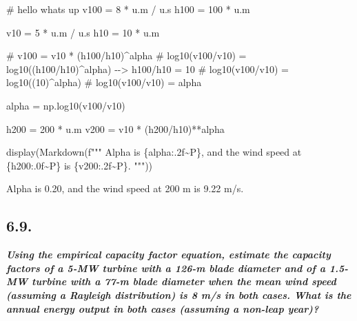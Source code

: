 \documentclass[
  letterpaper,
  DIV=11,
  numbers=noendperiod]{scrartcl}
\newenvironment{Shaded}{\begin{snugshade}}{\end{snugshade}}
\newcommand{\CommentTok}[1]{\textcolor[rgb]{0.37,0.37,0.37}{#1}}
\newcommand{\DecValTok}[1]{\textcolor[rgb]{0.68,0.00,0.00}{#1}}
\newcommand{\ErrorTok}[1]{\textcolor[rgb]{0.68,0.00,0.00}{#1}}
\newcommand{\FloatTok}[1]{\textcolor[rgb]{0.68,0.00,0.00}{#1}}
\newcommand{\NormalTok}[1]{\textcolor[rgb]{0.00,0.23,0.31}{#1}}
\newcommand{\OperatorTok}[1]{\textcolor[rgb]{0.37,0.37,0.37}{#1}}
\newcommand{\SpecialCharTok}[1]{\textcolor[rgb]{0.37,0.37,0.37}{#1}}
\newcommand{\SpecialStringTok}[1]{\textcolor[rgb]{0.13,0.47,0.30}{#1}}
\begin{document}
\begin{Shaded}
\begin{Highlighting}[]
\CommentTok{\# hello whats up }
\NormalTok{v100 }\OperatorTok{=} \DecValTok{8} \OperatorTok{*}\NormalTok{ u.m }\OperatorTok{/}\NormalTok{ u.s }
\NormalTok{h100 }\OperatorTok{=} \DecValTok{100} \OperatorTok{*}\NormalTok{ u.m }

\NormalTok{v10 }\OperatorTok{=} \DecValTok{5} \OperatorTok{*}\NormalTok{ u.m }\OperatorTok{/}\NormalTok{ u.s }
\NormalTok{h10 }\OperatorTok{=} \DecValTok{10} \OperatorTok{*}\NormalTok{ u.m }

\CommentTok{\# v100 = v10 * (h100/h10)\^{}alpha }
\CommentTok{\# log10(v100/v10) = log10((h100/h10)\^{}alpha) {-}{-}\textgreater{}  h100/h10 = 10 }
\CommentTok{\# log10(v100/v10) = log10((10)\^{}alpha)}
\CommentTok{\# log10(v100/v10) = alpha}

\NormalTok{alpha }\OperatorTok{=}\NormalTok{ np.log10(v100}\OperatorTok{/}\NormalTok{v10)}

\NormalTok{h200 }\OperatorTok{=} \DecValTok{200} \OperatorTok{*}\NormalTok{ u.m}
\NormalTok{v200 }\OperatorTok{=}\NormalTok{ v10 }\OperatorTok{*}\NormalTok{ (h200}\OperatorTok{/}\NormalTok{h10)}\OperatorTok{**}\NormalTok{alpha}

\NormalTok{display(Markdown(}\SpecialStringTok{f"""}
\SpecialStringTok{Alpha is  }\SpecialCharTok{\{}\NormalTok{alpha}\SpecialCharTok{:}\FloatTok{.2}\ErrorTok{f}\OperatorTok{\textasciitilde{}}\NormalTok{P}\SpecialCharTok{\}}\SpecialStringTok{, and the wind speed at }\SpecialCharTok{\{}\NormalTok{h200}\SpecialCharTok{:}\FloatTok{.0}\ErrorTok{f}\OperatorTok{\textasciitilde{}}\NormalTok{P}\SpecialCharTok{\}}\SpecialStringTok{ is }\SpecialCharTok{\{}\NormalTok{v200}\SpecialCharTok{:}\FloatTok{.2}\ErrorTok{f}\OperatorTok{\textasciitilde{}}\NormalTok{P}\SpecialCharTok{\}}\SpecialStringTok{.}
\SpecialStringTok{"""}\NormalTok{))}
\end{Highlighting}
\end{Shaded}

Alpha is 0.20, and the wind speed at 200 m is 9.22 m/s.

\hypertarget{section-3}{%
\subsection{6.9.}\label{section-3}}

\textbf{\emph{Using the empirical capacity factor equation, estimate the
capacity factors of a 5-MW turbine with a 126-m blade diameter and of a
1.5-MW turbine with a 77-m blade diameter when the mean wind speed
(assuming a Rayleigh distribution) is 8 m/s in both cases. What is the
annual energy output in both cases (assuming a non-leap year)?}}
\end{document}
